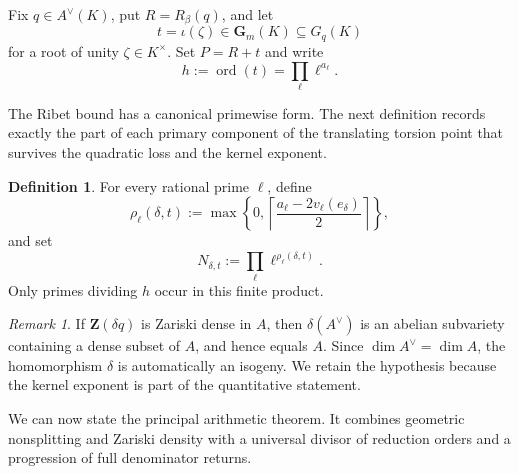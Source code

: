 \documentclass[11pt,letterpaper,reqno]{amsart}
\theoremstyle{definition}
\newtheorem{definition}[theorem]{Definition}
\theoremstyle{remark}
\newtheorem{remark}[theorem]{Remark}
\newcommand{\Gm}{\mathbf G_m}
\newcommand{\ord}{\operatorname{ord}}
\begin{document}
Fix $q\in A^\vee(K)$, put $R=R_\beta(q)$, and let
\[
 t=\iota(\zeta)\in\Gm(K)\subseteq G_q(K)
\]
for a root of unity $\zeta\in K^\times$.  Set $P=R+t$ and write
\[
 h:=\ord(t)=\prod_\ell\ell^{a_\ell}.
\]

The Ribet bound has a canonical primewise form.  The next definition records
exactly the part of each primary component of the translating torsion point
that survives the quadratic loss and the kernel exponent.

\begin{definition}\label{def:Ndelta}
For every rational prime $\ell$, define
\begin{equation}\label{eq:rho-definition}
 \rho_\ell(\delta,t):=
 \max\left\{0,
 \left\lceil\frac{a_\ell-2v_\ell(e_\delta)}{2}\right\rceil
 \right\},
\end{equation}
and set
\begin{equation}\label{eq:N-definition}
 N_{\delta,t}:=\prod_\ell\ell^{\rho_\ell(\delta,t)}.
\end{equation}
Only primes dividing $h$ occur in this finite product.
\end{definition}

\begin{remark}
If $\mathbf Z(\delta q)$ is Zariski dense in $A$, then $\delta(A^\vee)$ is an
abelian subvariety containing a dense subset of $A$, and hence equals $A$.
Since $\dim A^\vee=\dim A$, the homomorphism $\delta$ is automatically an
isogeny.  We retain the hypothesis because the kernel exponent is part of the
quantitative statement.
\end{remark}

We can now state the principal arithmetic theorem.  It combines geometric
nonsplitting and Zariski density with a universal divisor of reduction orders
and a progression of full denominator returns.
\end{document}
